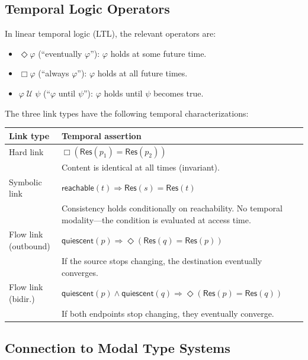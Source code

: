 \documentclass[11pt]{article}
\newcommand{\tp}[1]{\mathsf{#1}}
\newcommand{\eventually}{\Diamond}
\newcommand{\always}{\Box}
\begin{document}
\subsection{Temporal Logic Operators}

In linear temporal logic (LTL), the relevant operators are:

\begin{itemize}
  \item $\eventually \varphi$ (``eventually $\varphi$''): $\varphi$ holds at
    some future time.
  \item $\always \varphi$ (``always $\varphi$''): $\varphi$ holds at all
    future times.
  \item $\varphi \;\mathcal{U}\; \psi$ (``$\varphi$ until $\psi$''):
    $\varphi$ holds until $\psi$ becomes true.
\end{itemize}

The three link types have the following temporal characterizations:

\begin{center}
\begin{tabular}{lp{8cm}}
\toprule
\textbf{Link type} & \textbf{Temporal assertion} \\
\midrule
Hard link &
  $\always (\tp{Res}(p_1) = \tp{Res}(p_2))$ \\
  & Content is identical at all times (invariant). \\
\addlinespace
Symbolic link &
  $\tp{reachable}(t) \Rightarrow \tp{Res}(s) = \tp{Res}(t)$ \\
  & Consistency holds conditionally on reachability. No temporal modality---the
    condition is evaluated at access time. \\
\addlinespace
Flow link (outbound) &
  $\tp{quiescent}(p) \Rightarrow \eventually (\tp{Res}(q) = \tp{Res}(p))$ \\
  & If the source stops changing, the destination eventually converges. \\
\addlinespace
Flow link (bidir.) &
  $\tp{quiescent}(p) \land \tp{quiescent}(q) \Rightarrow \eventually
    (\tp{Res}(p) = \tp{Res}(q))$ \\
  & If both endpoints stop changing, they eventually converge. \\
\bottomrule
\end{tabular}
\end{center}

\subsection{Connection to Modal Type Systems}
\end{document}
